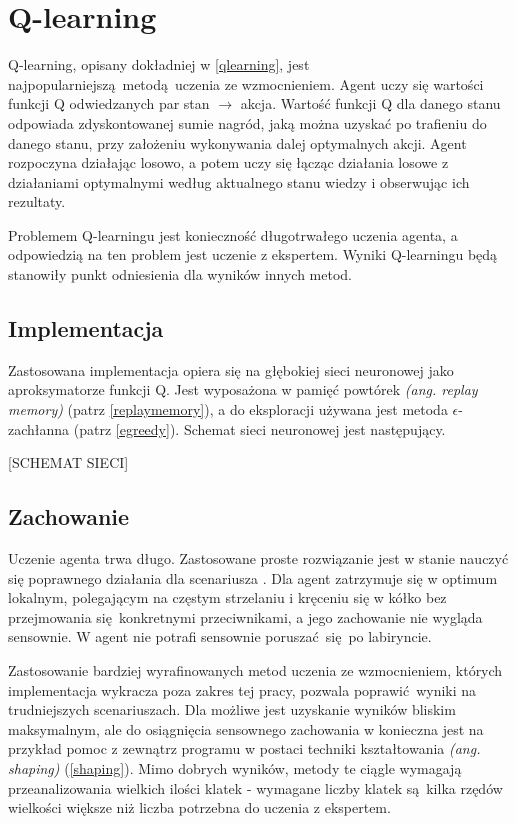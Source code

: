\section{Q-learning}\label{q_learning}
Q-learning, opisany dokładniej w \ref{qlearning},  jest najpopularniejszą metodą uczenia ze wzmocnieniem. Agent uczy się wartości funkcji Q odwiedzanych par stan $\to$ akcja. Wartość funkcji Q dla danego stanu odpowiada zdyskontowanej sumie nagród, jaką można uzyskać po trafieniu do danego stanu, przy założeniu wykonywania dalej optymalnych akcji. Agent rozpoczyna działając losowo, a potem uczy się łącząc działania losowe z działaniami optymalnymi według aktualnego stanu wiedzy i obserwując ich rezultaty.

Problemem Q-learningu jest konieczność długotrwałego uczenia agenta, a odpowiedzią na ten problem jest uczenie z ekspertem. Wyniki Q-learningu będą stanowiły punkt odniesienia dla wyników innych metod.

\subsection{Implementacja}

Zastosowana implementacja opiera się na głębokiej sieci neuronowej jako aproksymatorze funkcji Q. Jest wyposażona w pamięć powtórek \textit{(ang. replay memory)} (patrz \ref{replaymemory}), a do eksploracji używana jest metoda $\epsilon$-zachłanna (patrz \ref{egreedy}). Schemat sieci neuronowej jest następujący.

[SCHEMAT SIECI]


\subsection{Zachowanie}
Uczenie agenta trwa długo. Zastosowane proste rozwiązanie jest w stanie nauczyć się poprawnego działania dla scenariusza . Dla  agent zatrzymuje się w optimum lokalnym, polegającym na częstym strzelaniu i kręceniu się w kółko bez przejmowania się konkretnymi przeciwnikami, a jego zachowanie nie wygląda sensownie. W  agent nie potrafi sensownie poruszać się po labiryncie.

Zastosowanie bardziej wyrafinowanych metod uczenia ze wzmocnieniem, których implementacja wykracza poza zakres tej pracy, pozwala poprawić wyniki na trudniejszych scenariuszach. Dla  możliwe jest uzyskanie wyników bliskim maksymalnym, ale do osiągnięcia sensownego zachowania w  konieczna jest na przykład pomoc z zewnątrz programu w postaci techniki kształtowania \textit{(ang. shaping)} (\ref{shaping}). Mimo dobrych wyników, metody te ciągle wymagają przeanalizowania wielkich ilości klatek - wymagane liczby klatek są kilka rzędów wielkości większe niż liczba potrzebna do uczenia z ekspertem.


